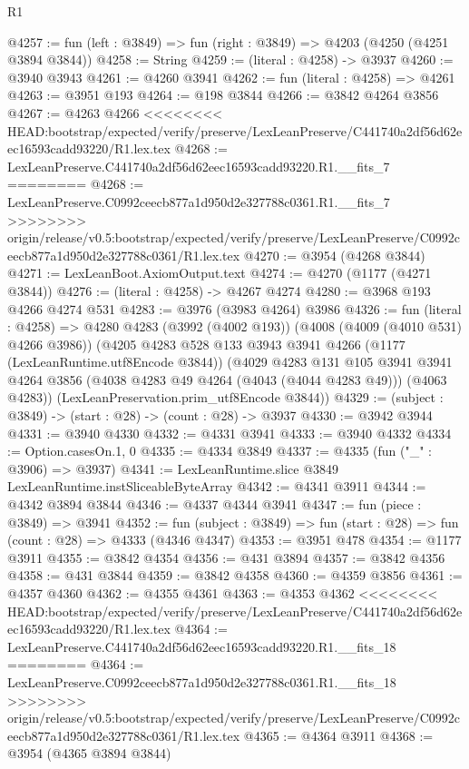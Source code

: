\begin{lexlean}{R1}
\begin{coremodule}
{{{{{{{{{{{{{{{{{{{{{{{{{{{{{{{{{{{{{{{{{{{{{{{{{{{{{{{{{{{{{{{{{{{{{{{{{{{{{{{{{{{{{{{{{{{{{{{{{{{{{{{{{{{{{{{{{{{{{{{{{{{{{{{{{{{{{{{{{{{{{{{{{{{{{{{{{{{{{{{{{{{{{{{{{{{{{{{{{{{{{{{{{{@4257 := fun (left : @3849) => fun (right : @3849) => @4203 (@4250 (@4251 @3894 @3844))
@4258 := String
@4259 := (literal : @4258) -> @3937
@4260 := @3940 @3943
@4261 := @4260 @3941
@4262 := fun (literal : @4258) => @4261
@4263 := @3951 @193
@4264 := @198 @3844
@4266 := @3842 @4264 @3856
@4267 := @4263 @4266
<<<<<<<< HEAD:bootstrap/expected/verify/preserve/LexLeanPreserve/C441740a2df56d62eec16593cadd93220/R1.lex.tex
@4268 := LexLeanPreserve.C441740a2df56d62eec16593cadd93220.R1.__fits_7
========
@4268 := LexLeanPreserve.C0992ceecb877a1d950d2e327788c0361.R1.__fits_7
>>>>>>>> origin/release/v0.5:bootstrap/expected/verify/preserve/LexLeanPreserve/C0992ceecb877a1d950d2e327788c0361/R1.lex.tex
@4270 := @3954 (@4268 @3844)
@4271 := LexLeanBoot.AxiomOutput.text
@4274 := @4270 (@1177 (@4271 @3844))
@4276 := (literal : @4258) -> @4267 @4274
@4280 := @3968 @193 @4266 @4274 @531
@4283 := @3976 (@3983 @4264) @3986
@4326 := fun (literal : @4258) =>
  @4280
    @4283
    (@3992 (@4002 @193))
    (@4008 (@4009 (@4010 @531) @4266 @3986))
    (@4205
      @4283
      @528
      @133
      @3943
      @3941
      @4266
      (@1177 (LexLeanRuntime.utf8Encode @3844))
      (@4029
        @4283
        @131
        @105
        @3941
        @3941
        @4264
        @3856
        (@4038 @4283 @49 @4264 (@4043 (@4044 @4283 @49)))
        (@4063 @4283))
      (LexLeanPreservation.prim_utf8Encode @3844))
@4329 := (subject : @3849) -> (start : @28) -> (count : @28) -> @3937
@4330 := @3942 @3944
@4331 := @3940 @4330
@4332 := @4331 @3941
@4333 := @3940 @4332
@4334 := Option.casesOn.{1, 0}
@4335 := @4334 @3849
@4337 := @4335 (fun ("_" : @3906) => @3937)
@4341 := LexLeanRuntime.slice @3849 LexLeanRuntime.instSliceableByteArray
@4342 := @4341 @3911
@4344 := @4342 @3894 @3844
@4346 := @4337 @4344 @3941
@4347 := fun (piece : @3849) => @3941
@4352 := fun (subject : @3849) => fun (start : @28) => fun (count : @28) => @4333 (@4346 @4347)
@4353 := @3951 @478
@4354 := @1177 @3911
@4355 := @3842 @4354
@4356 := @431 @3894
@4357 := @3842 @4356
@4358 := @431 @3844
@4359 := @3842 @4358
@4360 := @4359 @3856
@4361 := @4357 @4360
@4362 := @4355 @4361
@4363 := @4353 @4362
<<<<<<<< HEAD:bootstrap/expected/verify/preserve/LexLeanPreserve/C441740a2df56d62eec16593cadd93220/R1.lex.tex
@4364 := LexLeanPreserve.C441740a2df56d62eec16593cadd93220.R1.__fits_18
========
@4364 := LexLeanPreserve.C0992ceecb877a1d950d2e327788c0361.R1.__fits_18
>>>>>>>> origin/release/v0.5:bootstrap/expected/verify/preserve/LexLeanPreserve/C0992ceecb877a1d950d2e327788c0361/R1.lex.tex
@4365 := @4364 @3911
@4368 := @3954 (@4365 @3894 @3844)
}}}}}}}}}}}}}}}}}}}}}}}}}}}}}}}}}}}}}}}}}}}}}}}}}}}}}}}}}}}}}}}}}}}}}}}}}}}}}}}}}}}}}}}}}}}}}}}}}}}}}}}}}}}}}}}}}}}}}}}}}}}}}}}}}}}}}}}}}}}}}}}}}}}}}}}}}}}}}}}}}}}}}}}}}}}}}}}}}}}}}}}}}}
\end{coremodule}
\end{lexlean}

